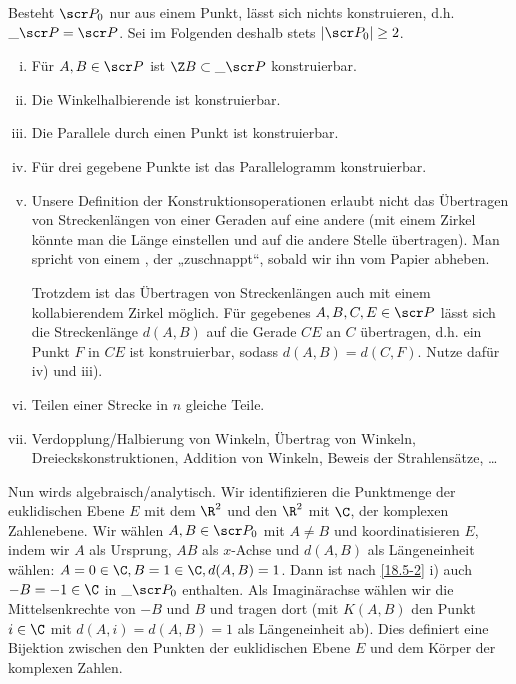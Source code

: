 Besteht $\scr P_0$ nur aus einem Punkt, lässt sich nichts konstruieren, d.h. $\_{\scr P} = \scr P$.
Sei im Folgenden deshalb stets $|\scr P_0| \ge 2$.


\begin{ex} \label{18.5-2}
	\begin{enumerate}[i)]
		\item
			Für $A, B \in \scr P$ ist $\Z B \subset \_{\scr P}$ konstruierbar.
		\item
			Die Winkelhalbierende ist konstruierbar.
		\item
			Die Parallele durch einen Punkt ist konstruierbar.
		\item
			Für drei gegebene Punkte ist das Parallelogramm konstruierbar.
		\item
			Unsere Definition der Konstruktionsoperationen erlaubt nicht das Übertragen von Streckenlängen von einer Geraden auf eine andere (mit einem Zirkel könnte man die Länge einstellen und auf die andere Stelle übertragen).
			Man spricht von einem , der „zuschnappt“, sobald wir ihn vom Papier abheben.

			Trotzdem ist das Übertragen von Streckenlängen auch mit einem kollabierendem Zirkel möglich.
			Für gegebenes $A, B, C, E \in \scr P$ lässt sich die Streckenlänge $d(A, B)$ auf die Gerade $CE$ an $C$ übertragen, d.h. ein Punkt $F$ in $CE$ ist konstruierbar, sodass $d(A, B) = d(C, F)$.
			Nutze dafür iv) und iii).
		\item
			Teilen einer Strecke in $n$ gleiche Teile.
		\item
			Verdopplung/Halbierung von Winkeln, Übertrag von Winkeln, Dreieckskonstruktionen, Addition von Winkeln, Beweis der Strahlensätze, \dots
	\end{enumerate}
\end{ex}

Nun wirds algebraisch/analytisch.
Wir identifizieren die Punktmenge der euklidischen Ebene $E$ mit dem $\R^2$ und den $\R^2$ mit $\C$, der komplexen Zahlenebene.
Wir wählen $A, B \in \scr P_0$ mit $A \neq B$ und koordinatisieren $E$, indem wir $A$ als Ursprung, $AB$ als $x$-Achse und $d(A,B)$ als Längeneinheit wählen: $A = 0 \in \C, B = 1 \in \C, d(A, B) = 1$.
Dann ist nach \ref{18.5-2} i) auch $-B = -1 \in \C$ in $\_{\scr P_0}$ enthalten.
Als Imaginärachse wählen wir die Mittelsenkrechte von $-B$ und $B$ und tragen dort (mit $K(A,B)$ den Punkt $i \in \C$ mit $d(A, i) = d(A, B) = 1$ als Längeneinheit ab).
Dies definiert eine Bijektion zwischen den Punkten der euklidischen Ebene $E$ und dem Körper der komplexen Zahlen.

